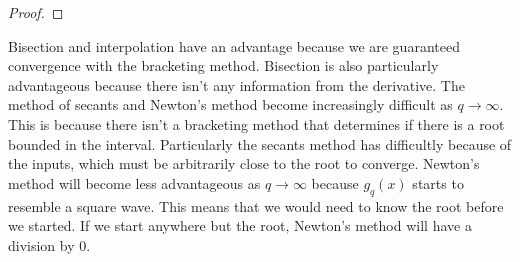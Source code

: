 \documentclass{article}
\begin{document}
\begin{flushleft}
\begin{proof}
			\end{proof}
			
			Bisection and interpolation have an advantage because we are guaranteed convergence with the bracketing method. Bisection is also particularly advantageous because there isn't any information from the derivative. The method of secants and Newton's method become increasingly difficult as $q \to \infty$. This is because there isn't a bracketing method that determines if there is a root bounded in the interval. Particularly the secants method has difficultly because of the inputs, which must be arbitrarily close to the root to converge. Newton's method will become less advantageous as $q \to \infty$ because $g_q(x)$ starts to resemble a square wave. This means that we would need to know the root before we started. If we start anywhere but the root, Newton's method will have a division by 0.
	
	\end{flushleft}
	
\end{document}
